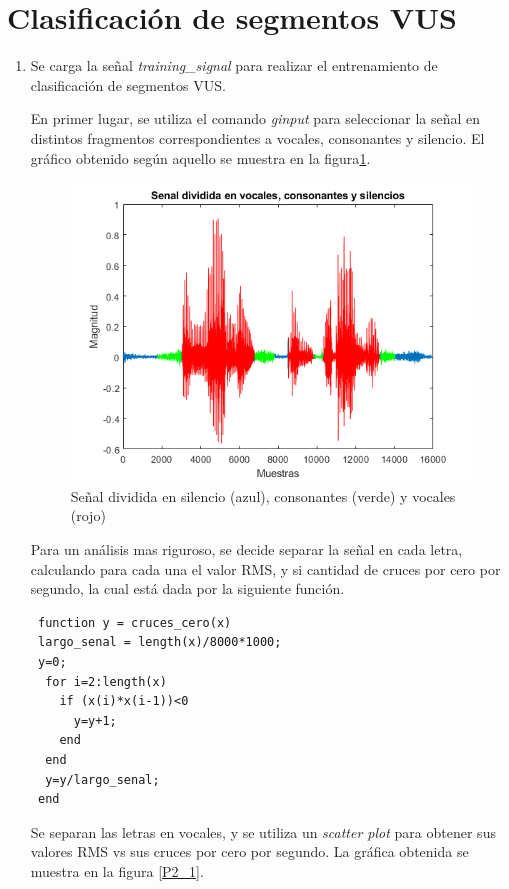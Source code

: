 \documentclass[letterpaper,onecolumn,10pt,journal,final]{IEEEtran}
\begin{document}
\section{Clasificación de segmentos VUS}
\begin{enumerate}[1)]
    \item %
Se carga la señal \textit{training\_signal} para realizar el entrenamiento de clasificación de segmentos VUS.    

En primer lugar, se utiliza el comando \textit{ginput} para seleccionar la señal en distintos fragmentos correspondientes a vocales, consonantes y silencio. El gráfico obtenido según aquello se muestra en la figura\ref{P2}.
\begin{figure}[H]
    \centering
    \includegraphics[width = 0.9 \linewidth]{Figuras/P2.png}
    \caption{Señal dividida en silencio (azul), consonantes (verde) y vocales (rojo)}
    \label{P2}
\end{figure}

Para un análisis mas riguroso, se decide separar la señal en cada letra, calculando para cada una el valor RMS, y si cantidad de cruces por cero por segundo, la cual está dada por la siguiente función.

\begin{lstlisting}
 function y = cruces_cero(x)
 largo_senal = length(x)/8000*1000;
 y=0;
  for i=2:length(x)
    if (x(i)*x(i-1))<0
      y=y+1;
    end
  end
  y=y/largo_senal;
 end
\end{lstlisting}

Se separan las letras en vocales, y se utiliza un \textit{scatter plot} para obtener sus valores RMS vs sus cruces por cero por segundo. La gráfica obtenida se muestra en la figura \ref{P2_1}.


\end{enumerate}
\end{document}
